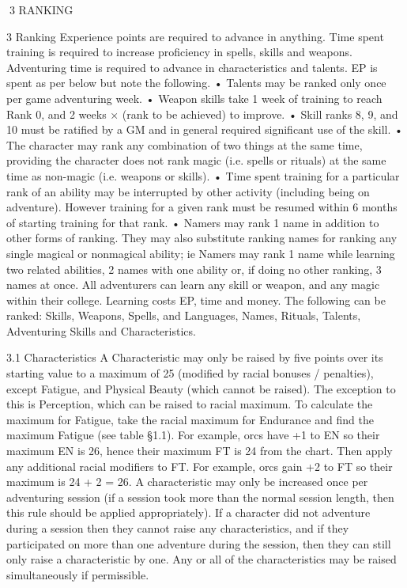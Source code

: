 \documentclass[a4paper]{article}
\begin{document}
\begin{multicols}{3}
3 RANKING

3 Ranking
Experience points are required to advance in anything. Time spent training is required to increase
proficiency in spells, skills and weapons. Adventuring time is required to advance in characteristics
and talents.
EP is spent as per below but note the following.
• Talents may be ranked only once per game adventuring week.
• Weapon skills take 1 week of training to reach
Rank 0, and 2 weeks × (rank to be achieved) to
improve.
• Skill ranks 8, 9, and 10 must be ratified by a GM
and in general required significant use of the skill.
• The character may rank any combination of two
things at the same time, providing the character
does not rank magic (i.e. spells or rituals) at the
same time as non-magic (i.e. weapons or skills).
• Time spent training for a particular rank of an
ability may be interrupted by other activity (including being on adventure). However training for a
given rank must be resumed within 6 months of
starting training for that rank.
• Namers may rank 1 name in addition to other
forms of ranking. They may also substitute ranking
names for ranking any single magical or nonmagical ability; ie Namers may rank 1 name while
learning two related abilities, 2 names with one
ability or, if doing no other ranking, 3 names at
once.
All adventurers can learn any skill or weapon, and
any magic within their college. Learning costs EP,
time and money. The following can be ranked:
Skills, Weapons, Spells, and Languages, Names,
Rituals, Talents, Adventuring Skills and Characteristics.

3.1 Characteristics
A Characteristic may only be raised by five points
over its starting value to a maximum of 25 (modified by racial bonuses / penalties), except Fatigue,
and Physical Beauty (which cannot be raised). The
exception to this is Perception, which can be raised
to racial maximum.
To calculate the maximum for Fatigue, take the
racial maximum for Endurance and find the maximum Fatigue (see table §1.1). For example, orcs
have +1 to EN so their maximum EN is 26, hence
their maximum FT is 24 from the chart. Then apply
any additional racial modifiers to FT. For example,
orcs gain +2 to FT so their maximum is 24 + 2 =
26.
A characteristic may only be increased once per
adventuring session (if a session took more than
the normal session length, then this rule should be
applied appropriately). If a character did not adventure during a session then they cannot raise any
characteristics, and if they participated on more
than one adventure during the session, then they
can still only raise a characteristic by one. Any or
all of the characteristics may be raised simultaneously if permissible.


\end{multicols}
\end{document}

